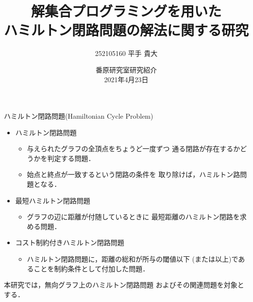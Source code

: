 \documentclass[dvipdfmx,10pt]{beamer}
\title{解集合プログラミングを用いた\\ハミルトン閉路問題の解法に関する研究}
\author{252105160 平手 貴大}
\date{番原研究室研究紹介\\2021年4月23日}
\begin{document}

\frame{\maketitle}

\begin{frame}{ハミルトン閉路問題(Hamiltonian Cycle Problem)}
  \begin{itemize}
  \item \alert{ハミルトン閉路問題}
    \begin{itemize}
    \item 与えられたグラフの全頂点をちょうど一度ずつ
      通る閉路が存在するかどうかを判定する問題．
    \item 始点と終点が一致するという閉路の条件を
      取り除けば，ハミルトン路問題となる．
    \end{itemize}
  \item \alert{最短ハミルトン閉路問題}
    \begin{itemize}
    \item グラフの辺に距離が付随しているときに
      最短距離のハミルトン閉路を求める問題．
    \end{itemize}
  \item \alert{コスト制約付きハミルトン閉路問題}
    \begin{itemize}
    \item ハミルトン閉路問題に，距離の総和が所与の閾値以下
      (または以上)であることを制約条件として付加した問題．
    \end{itemize}
  \end{itemize}
  \begin{alertblock}{}
    本研究では，無向グラフ上のハミルトン閉路問題
    およびその関連問題を対象とする．    
  \end{alertblock}
\end{frame}
\end{document}
